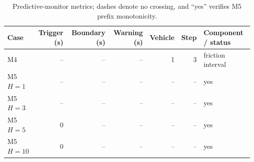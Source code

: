 \begin{table}[!t]
\centering
\caption{Predictive-monitor metrics; dashes denote no crossing, and ``yes'' verifies M5 prefix monotonicity.}
\label{tab:phase2m-predictive}
\normalsize
\begin{tabular}{@{}lrrrrrp{}@{}}
\hline
Case & Trigger (s) & Boundary (s) & Warning (s) & Vehicle & Step & Component / status \\
\hline
M4 & -- & -- & -- & 1 & 3 & friction interval \\
M5 $H=1$ & -- & -- & -- & -- & -- & yes \\
M5 $H=3$ & -- & -- & -- & -- & -- & yes \\
M5 $H=5$ & 0 & -- & -- & -- & -- & yes \\
M5 $H=10$ & 0 & -- & -- & -- & -- & yes \\
\hline
\end{tabular}
\end{table}
